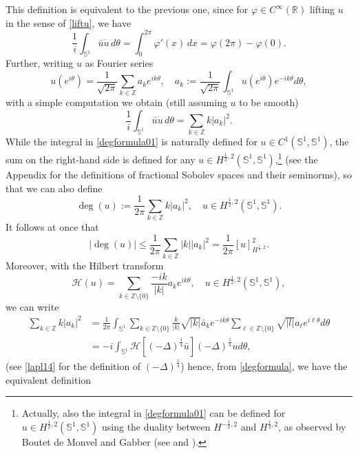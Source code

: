 \documentclass[12pt, a4paper]{article}
\newcommand{\sph}{\mathbb{S}}
\newcommand{\R}{\mathbb{R}}
\renewcommand{\(}{\left(}
\renewcommand{\)}{\right)}
\begin{document}
This definition is equivalent to the previous one, since for $\varphi\in C^\infty(\R)$ lifting $u$ in the sense of \eqref{liftu}, we have
$$\frac{1}{i}\int_{\sph^1}\bar u \dot u\,d\theta =\int_0^{2\pi} \varphi'(x)\,dx={\varphi(2\pi)-\varphi(0)}.$$
Further, writing $u$ as Fourier series
$$u(e^{i\theta})=\frac{1}{\sqrt{2\pi}}\sum_{k\in\mathbb{Z}}a_k e^{ik\theta},\quad a_k:=\frac{1}{\sqrt{2\pi}}\int_{\sph^1}u(e^{i\theta})e^{-ik\theta}d\theta,$$
 with a simple computation we obtain (still assuming $u$ to be smooth)
\begin{equation}\label{degformula01}
\frac{1}{i}\int_{\sph^1} \bar u \dot u\, d\theta=\sum_{k\in\mathbb{Z}}k|a_k|^2.
\end{equation}
While the integral in \eqref{degformula01} is naturally defined for $u\in C^1(\sph^1,\sph^1)$, the sum on the right-hand side is defined for any $u\in H^{\frac12,2}(\sph^1,\sph^1)$,\footnote{Actually, also the integral in \eqref{degformula01} can be defined for $u\in H^{\frac{1}{2},2}(\sph^1,\sph^1)$ using the duality between $H^{-\frac{1}{2},2}$ and $H^{\frac{1}{2},2}$, as observed by Boutet de Monvel and Gabber (see \cite[p. 224]{BN} and \cite[Sec. 3]{bre}).} (see the Appendix for the definitions of fractional Sobolev spaces and their seminorms), so that we can also define
\begin{equation}\label{degformula}
\deg(u):=\frac{1}{2\pi}\sum_{k\in\mathbb{Z}}k|a_k|^2, \quad u\in H^{\frac{1}{2},2}(\sph^1,\sph^1).
\end{equation}
It follows at once that
\begin{equation}\label{degest}
|\deg(u)|\le \frac{1}{2\pi}\sum_{k\in\mathbb{Z}}|k||a_k|^2 =\frac{1}{2\pi}[u]_{H^{\frac{1}{2},2}}^2.
\end{equation}
Moreover, with the Hilbert transform
$$\mathcal{H}(u)=\sum_{k\in\mathbb{Z}\setminus\{0\}}\frac{-i k}{|k|}a_ke^{ik\theta}, \quad u\in H^{\frac{1}{2},2}(\sph^1,\sph^1),$$
we can write
\begin{equation}\label{degformulaH}
\begin{split}
\sum_{k\in\mathbb{Z}} k|a_k|^2
&=\frac{1}{2\pi} \int_{\sph^1} \sum_{k\in\mathbb{Z}\setminus\{0\}} \frac{k}{|k|}\sqrt{|k|} \bar a_ke^{-ik\theta} \sum_{\ell\in\mathbb{Z}\setminus\{0\}}\sqrt{|l|}a_\ell e^{i\ell \theta}d\theta\\
&={-i} \int_{\sph^1} \mathcal{H}[(-\Delta)^{\frac14} \bar u] (-\Delta)^{\frac14} u d\theta,
\end{split}
\end{equation}
(see \eqref{lapl14} for the definition of $(-\Delta)^{\frac14}$) hence, from \eqref{degformula}, we have the equivalent definition
\end{document}
